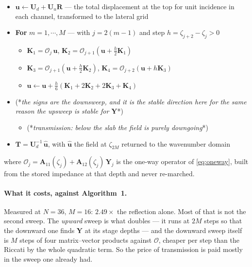 \documentclass[11pt,a4paper]{article}
\newcommand{\bA}{\mathbf{A}}
\newcommand{\bU}{\mathbf{U}}
\newcommand{\bT}{\mathbf{T}}
\newcommand{\bu}{\mathbf{u}}
\newcommand{\bR}{\mathbf{R}}
\newcommand{\bY}{\mathbf{Y}}
\begin{document}
\begin{minipage}{\linewidth}
\begin{itemize}
\item $\bu \leftarrow \bU_d + \bU_u\bR$ \quad --- the total displacement at the
      top for unit incidence in each channel, transformed to the lateral grid
\item \textbf{For} $m=1,\cdots,M$ \quad --- with $j=2(m-1)$ and step
      $h=\zeta_{j+2}-\zeta_{j}>0$
\begin{itemize}
\item $\mathbf{K}_1 = \mathcal{O}_{j}\,\bu$, \quad
      $\mathbf{K}_2 = \mathcal{O}_{j+1}\!\left(\bu+\tfrac{h}{2}\mathbf{K}_1\right)$
\item $\mathbf{K}_3 = \mathcal{O}_{j+1}\!\left(\bu+\tfrac{h}{2}\mathbf{K}_2\right)$,
      \quad
      $\mathbf{K}_4 = \mathcal{O}_{j+2}\!\left(\bu+h\mathbf{K}_3\right)$
\item $\bu \leftarrow \bu + \tfrac{h}{6}\left(\mathbf{K}_1+2\mathbf{K}_2
      +2\mathbf{K}_3+\mathbf{K}_4\right)$
\end{itemize}
\item (*{\em the signs are the downsweep, and it is the stable direction here
      for the same reason the upsweep is stable for $\bY$\/}*)

\begin{itemize}
\item (*{\em transmission: below the slab the field is purely downgoing\/}*)
\end{itemize}

\item $\bT = \bU_d^{-1}\,\hat{\bu}$, \quad with $\hat{\bu}$ the field at
      $\zeta_{2M}$ returned to the wavenumber domain
\end{itemize}
\end{minipage}

\vspace{3mm}
\noindent where
$\mathcal{O}_j = \bA_{11}(\zeta_j)+\bA_{12}(\zeta_j)\,\mathbf{Y}_j$ is the
one-way operator of \eqref{eq:oneway}, built from the stored impedance at that
depth and never re-marched.

\paragraph{What it costs, against Algorithm~1.}  Measured at $N=36$, $M=16$:
$2.49\times$ the reflection alone.  Most of that is not the second sweep.  The
\emph{upward} sweep is what doubles --- it runs at $2M$ steps so that the
downward one finds $\bY$ at its stage depths --- and the downward sweep itself
is $M$ steps of four matrix--vector products against $\mathcal{O}$, cheaper per
step than the Riccati by the whole quadratic term.  So the price of transmission
is paid mostly in the sweep one already had.
\end{document}
